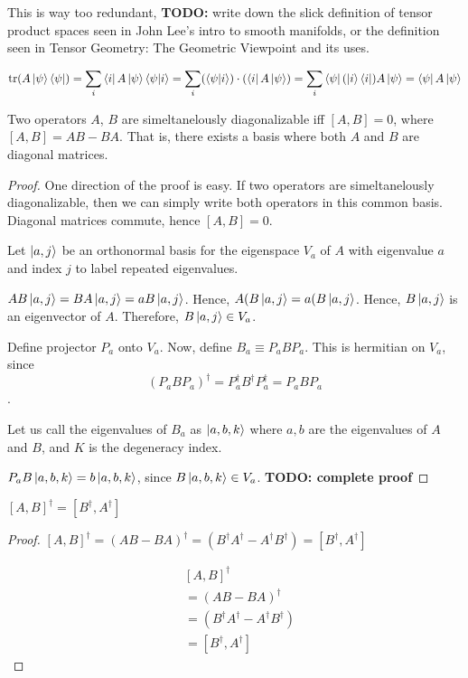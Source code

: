 This is way too redundant, \textbf{TODO:} write down the slick definition of tensor
product spaces seen in John Lee's intro to smooth manifolds, or the definition
seen in Tensor Geometry: The Geometric Viewpoint and its uses.

\begin{align*}
    \tr(A \ket \psi \bra \psi) = 
    \sum_i \bra i A \ket \psi \bra{\psi}\ket{i} =  
    \sum_i (\bra{\psi}\ket{i}) \cdot (\bra i A \ket \psi) = 
    \sum_i \bra{\psi}(\ket{i} \bra i) A \ket \psi = 
    \bra{\psi} A \ket \psi 
\end{align*}


\begin{theorem}
    Two operators $A$, $B$ are simeltanelously diagonalizable iff $[A, B] = 0$,
    where $[A, B] = AB - BA$. That is, there exists a basis where both $A$
    and $B$ are diagonal matrices.
\end{theorem}
\begin{proof}
    One direction of the proof is easy. If two operators are simeltanelously
    diagonalizable, then we can simply write both operators in this common
    basis. Diagonal matrices commute, hence $[A, B] = 0$.

    Let $\ket{a, j}$ be an orthonormal basis for the eigenspace $V_a$ of $A$
    with eigenvalue $a$ and index $j$ to label repeated eigenvalues.

    $AB \ket{a, j} = BA \ket{a, j} = a B \ket {a, j}$. Hence,
    $A (B \ket {a, j} = a (B \ket {a, j}$. Hence, $B \ket {a, j}$ is an
    eigenvector of $A$. Therefore, $B\ket{a, j} \in V_a$. 

    Define projector $P_a$ onto $V_a$. Now, define $B_a \equiv P_a B P_a$. This
    is hermitian on $V_a$, since $$(P_a B P_a)^\dagger = P_a^\dagger B^\dagger P_a^\dagger = P_a B P_a$$.

    Let us call the eigenvalues of $B_a$ as $\ket{a, b, k}$ where ${a, b}$ are
    the eigenvalues of $A$ and $B$, and $K$ is the degeneracy index.

    $P_a B \ket{a, b, k} = b \ket{a, b, k}$, since $B \ket{a, b, k} \in V_a$.
    \textbf{TODO: complete proof}
\end{proof}

\begin{lemma} $[A, B]^\dagger = [B^\dagger, A^\dagger]$
\end{lemma}
\begin{proof}
    $[A, B]^\dagger = (AB - BA)^\dagger = (B^\dagger A^\dagger - A^\dagger B^\dagger) = [B^\dagger, A^\dagger]$

    \begin{align*}
        &[A, B]^\dagger \\
        &= (AB - BA)^\dagger \\
        &= (B^\dagger A^\dagger - A^\dagger B^\dagger) \\
        &= [B^\dagger, A^\dagger]
    \end{align*}
\end{proof}

